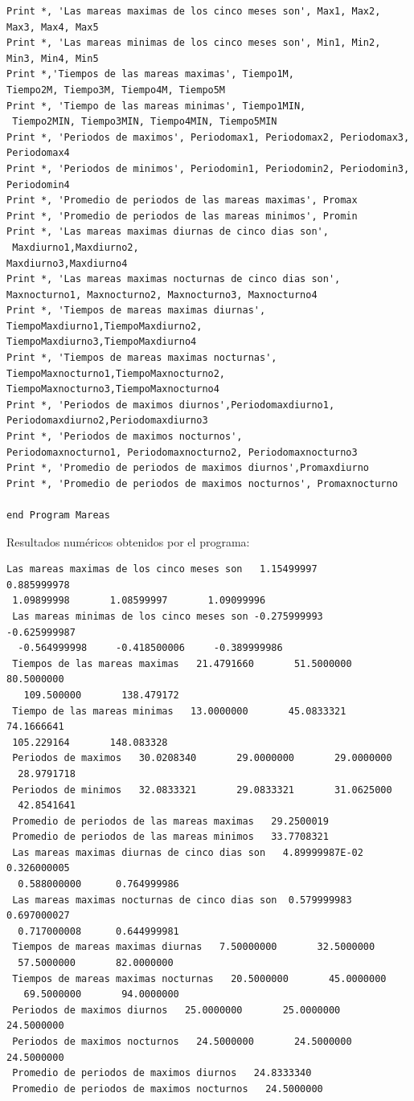 \documentclass[12pt]{article}
\begin{document}
\begin{verbatim}
Print *, 'Las mareas maximas de los cinco meses son', Max1, Max2, Max3, Max4, Max5
Print *, 'Las mareas minimas de los cinco meses son', Min1, Min2, Min3, Min4, Min5
Print *,'Tiempos de las mareas maximas', Tiempo1M, 
Tiempo2M, Tiempo3M, Tiempo4M, Tiempo5M
Print *, 'Tiempo de las mareas minimas', Tiempo1MIN,
 Tiempo2MIN, Tiempo3MIN, Tiempo4MIN, Tiempo5MIN
Print *, 'Periodos de maximos', Periodomax1, Periodomax2, Periodomax3, Periodomax4
Print *, 'Periodos de minimos', Periodomin1, Periodomin2, Periodomin3, Periodomin4
Print *, 'Promedio de periodos de las mareas maximas', Promax
Print *, 'Promedio de periodos de las mareas minimos', Promin
Print *, 'Las mareas maximas diurnas de cinco dias son',
 Maxdiurno1,Maxdiurno2,
Maxdiurno3,Maxdiurno4
Print *, 'Las mareas maximas nocturnas de cinco dias son', 
Maxnocturno1, Maxnocturno2, Maxnocturno3, Maxnocturno4
Print *, 'Tiempos de mareas maximas diurnas', TiempoMaxdiurno1,TiempoMaxdiurno2,
TiempoMaxdiurno3,TiempoMaxdiurno4
Print *, 'Tiempos de mareas maximas nocturnas', TiempoMaxnocturno1,TiempoMaxnocturno2,
TiempoMaxnocturno3,TiempoMaxnocturno4
Print *, 'Periodos de maximos diurnos',Periodomaxdiurno1,
Periodomaxdiurno2,Periodomaxdiurno3
Print *, 'Periodos de maximos nocturnos',
Periodomaxnocturno1, Periodomaxnocturno2, Periodomaxnocturno3
Print *, 'Promedio de periodos de maximos diurnos',Promaxdiurno
Print *, 'Promedio de periodos de maximos nocturnos', Promaxnocturno

end Program Mareas
\end{verbatim}

Resultados numéricos obtenidos por el programa:
\begin{verbatim}
Las mareas maximas de los cinco meses son   1.15499997      0.885999978      
 1.09899998       1.08599997       1.09099996    
 Las mareas minimas de los cinco meses son -0.275999993     -0.625999987    
  -0.564999998     -0.418500006     -0.389999986    
 Tiempos de las mareas maximas   21.4791660       51.5000000       80.5000000     
   109.500000       138.479172    
 Tiempo de las mareas minimas   13.0000000       45.0833321       74.1666641       
 105.229164       148.083328    
 Periodos de maximos   30.0208340       29.0000000       29.0000000      
  28.9791718    
 Periodos de minimos   32.0833321       29.0833321       31.0625000      
  42.8541641    
 Promedio de periodos de las mareas maximas   29.2500019    
 Promedio de periodos de las mareas minimos   33.7708321    
 Las mareas maximas diurnas de cinco dias son   4.89999987E-02  0.326000005     
  0.588000000      0.764999986    
 Las mareas maximas nocturnas de cinco dias son  0.579999983      0.697000027     
  0.717000008      0.644999981    
 Tiempos de mareas maximas diurnas   7.50000000       32.5000000      
  57.5000000       82.0000000    
 Tiempos de mareas maximas nocturnas   20.5000000       45.0000000     
   69.5000000       94.0000000    
 Periodos de maximos diurnos   25.0000000       25.0000000       24.5000000    
 Periodos de maximos nocturnos   24.5000000       24.5000000       24.5000000    
 Promedio de periodos de maximos diurnos   24.8333340    
 Promedio de periodos de maximos nocturnos   24.5000000    
\end{verbatim}
\end{document}
